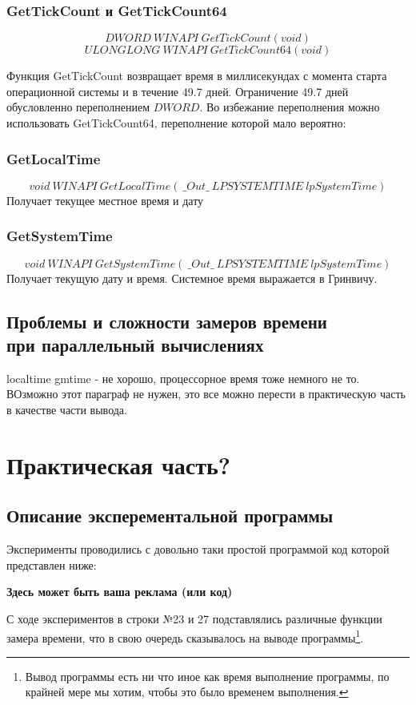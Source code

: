\documentclass{article}
\begin{document}
			\subsubsection*{GetTickCount и GetTickCount64}
				$$DWORD~WINAPI~GetTickCount(void)$$
				$$ULONGLONG~WINAPI~GetTickCount64(void)$$
				
					Функция GetTickCount возвращает время в миллисекундах с момента старта операционной системы и в течение 49.7 					дней. Ограничение 49.7 дней обусловленно переполнением $DWORD$. Во избежание переполнения можно использовать 						GetTickCount64, переполнение которой мало вероятно:			
			\subsubsection*{GetLocalTime}
			$$void~WINAPI~GetLocalTime(~\_Out\_~LPSYSTEMTIME~lpSystemTime)$$
			Получает текущее местное время и дату 
			\subsubsection*{GetSystemTime}
			$$void~WINAPI~GetSystemTime(~\_Out\_~LPSYSTEMTIME~lpSystemTime)$$
			Получает текущую дату и время. Системное время выражается в Гринвичу.			
		\newpage
		\subsection{Проблемы и сложности замеров времени \\ при параллельный вычислениях}
			localtime gmtime - не хорошо, процессорное время тоже немного не то. ВОзможно этот параграф не нужен, это все можно 			перести в практическую часть в качестве части вывода.
	\newpage
	\section{Практическая часть?}
		\subsection{Описание эксперементальной программы}
			Эксперименты проводились с довольно таки простой программой код которой представлен ниже:
			
		\begin{center}
			 \textbf{Здесь может быть ваша реклама (или код)}
		\end{center}
		
			С ходе экспериментов в строки №23 и 27 подставлялись различные функции замера времени, что в свою очередь сказывалось 			на выводе программы\footnote{Вывод программы есть ни что иное как время выполнение программы, по крайней мере мы 					хотим, чтобы это было временем выполнения.}.
			
\end{document}
